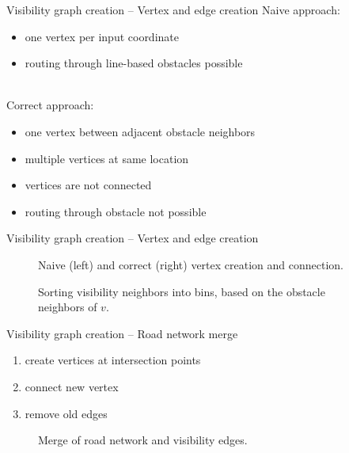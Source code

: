 \documentclass[xcolor={x11names}]{beamer}
\newcommand{\nn}{\hfill\\[2ex]}
\newenvironment{figcenter}
{%
	\parskip=0pt%
	\par%
	\nopagebreak%
	\centering%
}%
{%
	\par%
	\noindent%
	\ignorespacesafterend%
}
\begin{document}
		\begin{frame}{Visibility graph creation -- Vertex and edge creation}
			Naive approach:
			\begin{itemize}
				\item one vertex per input coordinate
				\item routing through line-based obstacles possible
			\end{itemize}
			\nn
			\pause
			Correct approach:
			\begin{itemize}
				\item one vertex between adjacent obstacle neighbors
				\item multiple vertices at same location
				\item vertices are not connected
				\item routing through obstacle not possible
			\end{itemize}
		\end{frame}
	
		\begin{frame}{Visibility graph creation -- Vertex and edge creation}
			\begin{figure}
				\begin{figcenter}
					\scalebox{0.7}
					{
						
					}
					\hspace{0.75cm}
					\scalebox{0.7}
					{
						
					}
				\end{figcenter}
				\caption{Naive (left) and correct (right) vertex creation and connection.}
			\end{figure}
			\pause
			\begin{figure}
				\begin{figcenter}
					\scalebox{0.7}
					{
						
					}
				\end{figcenter}
				\caption{Sorting visibility neighbors into bins, based on the obstacle neighbors of $v$.}
			\end{figure}
		\end{frame}
		
		\begin{frame}{Visibility graph creation -- Road network merge}
			\begin{enumerate}
				\item create vertices at intersection points
				\item connect new vertex
				\item remove old edges
			\end{enumerate}
			\begin{figure}
				\begin{figcenter}
					\scalebox{0.7}
					{
						
					}
					\hspace{0.75cm}
					\scalebox{0.7}
					{
						
					}
				\end{figcenter}
				\caption{Merge of road network and visibility edges.}
			\end{figure}
		\end{frame}
		
\end{document}
